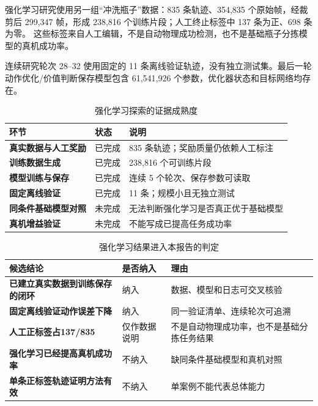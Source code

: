 强化学习研究使用另一组“冲洗瓶子”数据：835 条轨迹、354,835 个原始帧，经裁剪后 299,347 帧，形成 238,816 个训练片段；人工终止标签中 137 条为正、698 条为零。 这些标签来自人工编辑，不是自动物理成功检测，也不是基础瓶子分拣模型的真机成功率。

连续研究轮次 28--32 使用固定的 11 条离线验证轨迹，没有独立测试集。最后一轮动作优化/价值判断保存模型包含 61,541,926 个参数，优化器状态和目标网络均存在。

\begin{table}[H]
\centering
\caption{强化学习探索的证据成熟度}
\begin{tabularx}{\textwidth}{>{\bfseries}p{31mm}p{24mm}X}
\toprule
环节 & 状态 & 说明\\
\midrule
真实数据与人工奖励 & 已完成 & 835 条轨迹；奖励质量仍依赖人工标注\\
训练数据生成 & 已完成 & 238,816 个可训练片段\\
模型训练与保存 & 已完成 & 连续 5 个轮次、保存参数可读取\\
固定离线验证 & 已完成 & 11 条；规模小且无独立测试\\
同条件基础模型对照 & 未完成 & 无法判断强化学习是否真正优于基础模型\\
真机增益验证 & 未完成 & 不能写成已提高任务成功率\\
\bottomrule
\end{tabularx}
\end{table}

\begin{table}[H]
\centering
\caption{强化学习结果进入本报告的判定}
\begin{tabularx}{\textwidth}{>{\bfseries}p{38mm}p{24mm}X}
\toprule
候选结论 & 是否纳入 & 理由\\
\midrule
已建立真实数据到训练保存的闭环 & 纳入 & 数据、模型和日志可交叉核验\\
固定离线验证动作误差下降 & 纳入 & 同一验证清单、连续轮次可追溯\\
人工正标签占137/835 & 仅作数据说明 & 不是自动物理成功率，也不是基础分拣任务结果\\
强化学习已经提高真机成功率 & 不纳入 & 缺同条件基础模型和真机对照\\
单条正标签轨迹证明方法有效 & 不纳入 & 单案例不能代表总体能力\\
\bottomrule
\end{tabularx}
\end{table}
